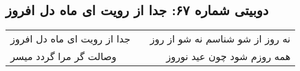 \begin{center}
\section*{دوبیتی شماره ۶۷: جدا از رویت ای ماه دل افروز}
\label{sec:067}
\begin{longtable}{l p{0.5cm} r}
جدا از رویت ای ماه دل افروز
&&
نه روز از شو شناسم نه شو از روز
\\
وصالت گر مرا گردد میسر
&&
همه روزم شود چون عید نوروز
\\
\end{longtable}
\end{center}
